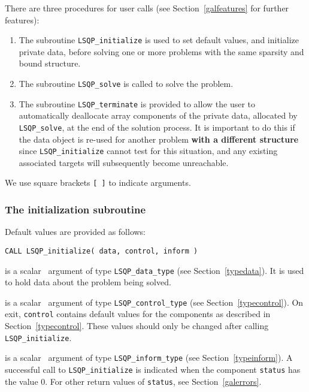 \documentclass{galahad}
\newcommand{\packagename}{LSQP}
\begin{document}

\galarguments
There are three procedures for user calls
(see Section~\ref{galfeatures} for further features): 

\begin{enumerate}
\item The subroutine 
      {\tt \packagename\_initialize} 
      is used to set default values, and initialize private data, 
      before solving one or more problems with the
      same sparsity and bound structure.
\item The subroutine 
      {\tt \packagename\_solve} 
      is called to solve the problem.
\item The subroutine 
      {\tt \packagename\_terminate} 
      is provided to allow the user to automatically deallocate array 
       components of the private data, allocated by 
       {\tt \packagename\_solve}, 
       at the end of the solution process. 
       It is important to do this if the data object is re-used for another 
       problem {\bf with a different structure}
       since {\tt \packagename\_initialize} cannot test for this situation, 
       and any existing associated targets will subsequently become unreachable.
\end{enumerate}
We use square brackets {\tt [ ]} to indicate \optional arguments.


\subsubsection{The initialization subroutine}\label{subinit}
 Default values are provided as follows:
\vspace*{1mm}

\hspace{8mm}
{\tt CALL \packagename\_initialize( data, control, inform )}

\vspace*{-3mm}
\begin{description}

 is a scalar \intentinout\ argument of type 
{\tt \packagename\_data\_type}
(see Section~\ref{typedata}). It is used to hold data about the problem being 
solved. 

 is a scalar \intentout\ argument of type 
{\tt \packagename\_control\_type}
(see Section~\ref{typecontrol}). 
On exit, {\tt control} contains default values for the components as
described in Section~\ref{typecontrol}.
These values should only be changed after calling 
{\tt \packagename\_initialize}.

 is a scalar \intentinout\ argument of type 
{\tt \packagename\_inform\_type}
(see Section~\ref{typeinform}). A successful call to
{\tt \packagename\_initialize}
is indicated when the  component {\tt status} has the value 0. 
For other return values of {\tt status}, see Section~\ref{galerrors}.

\end{description}
\end{document}
